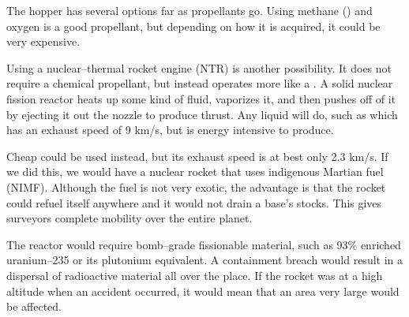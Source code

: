The hopper has several options far as propellants go. Using methane () and oxygen is a good propellant, but depending on how it is acquired, it could be very expensive.

Using a nuclear--thermal rocket engine (NTR) is another possibility. It does not require a chemical propellant, but instead operates more like a . A solid nuclear fission reactor heats up some kind of fluid, vaporizes it, and then pushes off of it by ejecting it out the nozzle to produce thrust. Any liquid will do, such as  which has an exhaust speed of 9 km/s, but is energy intensive to produce. 

Cheap  could be used instead, but its exhaust speed is at best only 2.3 km/s. If we did this, we would have a nuclear rocket that uses indigenous Martian fuel (NIMF). Although the fuel is not very exotic, the advantage is that the rocket could refuel itself anywhere and it would not drain a base's  stocks. This gives surveyors complete mobility over the entire planet.

The reactor would require bomb--grade fissionable material, such as 93\% enriched uranium--235 or its plutonium equivalent. A containment breach would result in a dispersal of radioactive material all over the place. If the rocket was at a high altitude when an accident occurred, it would mean that an area very large would be affected.

